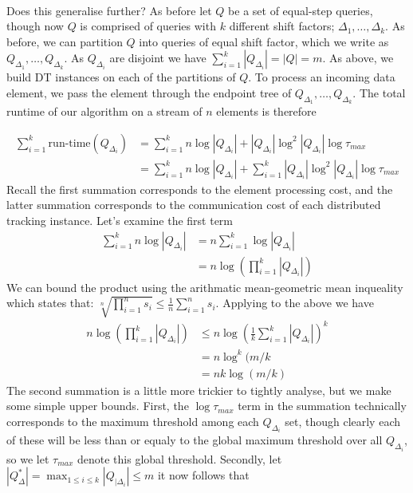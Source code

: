 \documentclass{article}
\begin{document}
\\
Does this generalise further? As before let $Q$ be a set of equal-step queries, though now $Q$ is comprised of queries with $k$ different shift factors; $\Delta_1, \dots, \Delta_k$. As before, we can partition $Q$ into queries of equal shift factor, which we write as $Q_{\Delta_1}, \dots, Q_{\Delta_k}$. As $Q_{\Delta_i}$ are disjoint we have 
$\sum_{i=1}^{k} |Q_{\Delta_i}| = |Q| = m$. As above, we build DT instances on each of the partitions of $Q$. To process an incoming data element, we pass the element through the endpoint tree of $Q_{\Delta_1},\dots, Q_{\Delta_k}$. The total runtime of our algorithm on a stream of $n$ elements is therefore

\begin{align*}
\sum_{i=1}^{k}\text{run-time}(Q_{\Delta_i}) &= \sum_{i=1}^{k} n\log |Q_{\Delta_i}| + |Q_{\Delta_i}|\log^2 |Q_{\Delta_i}| \log\tau_{max} \\
&= \sum_{i=1}^{k} n\log |Q_{\Delta_i}| + \sum_{i=1}^{k}  |Q_{\Delta_i}|\log^2 |Q_{\Delta_i}| \log\tau_{max} 
\end{align*}
Recall the first summation corresponds to the element processing cost, and the latter summation corresponds to the communication cost of each distributed tracking instance. Let's examine the first term
\begin{align*}
    \sum_{i=1}^{k} n\log |Q_{\Delta_i}| &= n\sum_{i=1}^{k}\log |Q_{\Delta_i}| \\
    &= n \log \left(\prod_{i=1}^{k}|Q_{\Delta_i}| \right)
\end{align*}
We can bound the product using the arithmatic mean-geometric mean inqueality which states that: 
$\sqrt[n]{\prod_{i=1}^{n} s_i} \leq \frac{1}{n}\sum_{i=1}^{n}s_i$. Applying to the above we have
\begin{align*}
     n \log \left(\prod_{i=1}^{k}|Q_{\Delta_i}| \right) &\leq n \log\left(
     \frac{1}{k}\sum_{i=1}^{k}|Q_{\Delta_i}|\right)^k \\
     &= n\log^k (m/k \\ 
     &= nk\log (m/k)
\end{align*}
The second summation is a little more trickier to tightly analyse, but we make some simple upper bounds. First, the $\log\tau_{max}$ term in the summation technically corresponds to the maximum threshold among each $Q_{\Delta_{i}}$ set, though clearly each of these will be less than or equaly to the global maximum threshold over all $Q_{\Delta_i}$, so we let $\tau_{max}$ denote this global threshold. Secondly, let $|Q_{\Delta}^*| = \max_{1\leq i \leq k} |Q_{|\Delta_i}|\leq m$ it now follows that 
\end{document}
